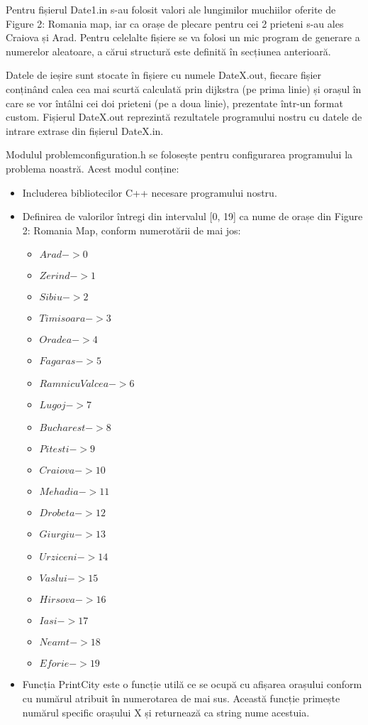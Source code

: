 \documentclass[a4paper]{article}
\begin{document}
Pentru fișierul Date1.in s-au folosit valori ale lungimilor muchiilor oferite de Figure 2: Romania map, iar ca orașe de plecare pentru cei 2 prieteni s-au ales Craiova și Arad. 
Pentru celelalte fișiere se va folosi un mic program de generare a numerelor aleatoare, a cărui structură este definită în secțiunea anterioară.

Datele de ieșire sunt stocate în fișiere cu numele DateX.out, fiecare fișier conținând calea cea mai scurtă calculată prin dijkstra (pe prima linie) și orașul în care se vor întâlni cei doi prieteni (pe a doua linie), prezentate într-un format custom. 
Fișierul DateX.out reprezintă rezultatele programului nostru cu datele de intrare extrase din fișierul DateX.in.

Modulul problemconfiguration.h se folosește pentru configurarea programului la problema noastră. Acest modul conține:
\begin{itemize}
    \item Includerea bibliotecilor C++ necesare programului nostru.
    \item Definirea de valorilor întregi din intervalul [0, 19] ca nume de orașe din Figure 2: Romania Map, conform numerotării de mai jos:
    \begin{itemize}
    \item $Arad -> 0$
    \item $Zerind -> 1$
    \item $Sibiu -> 2$
    \item $Timisoara -> 3$
    \item $Oradea -> 4$
    \item $Fagaras -> 5$
    \item $RamnicuValcea -> 6$
    \item $Lugoj -> 7$
    \item $Bucharest -> 8$
    \item $Pitesti -> 9$
    \item $Craiova -> 10$
    \item $Mehadia -> 11$
    \item $Drobeta -> 12$
    \item $Giurgiu -> 13$
    \item $Urziceni -> 14$
    \item $Vaslui -> 15$
    \item $Hirsova -> 16$
    \item $Iasi -> 17$
    \item $Neamt -> 18$
    \item $Eforie -> 19$
 \end{itemize}
    \item Funcția PrintCity este o funcție utilă ce se ocupă cu afișarea orașului conform cu numărul atribuit în numerotarea de mai sus. 
    Această funcție primește numărul specific orașului X și returnează ca string nume acestuia.
 \end{itemize}
\end{document}
